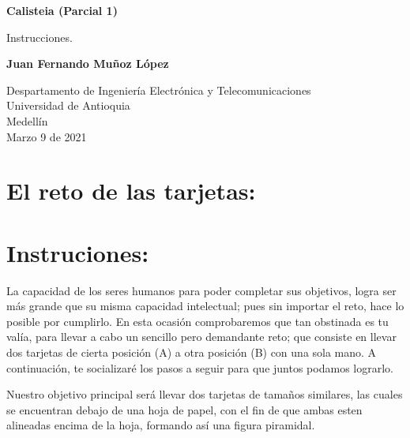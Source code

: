 \documentclass{article}
\begin{document}
\begin{titlepage}
    \begin{center}
        \vspace*{1cm}
            
        \Huge
        \textbf{Calisteia (Parcial 1)}
            
        \vspace{0.5cm}
        \LARGE
        Instrucciones.
            
        \vspace{1.5cm}
            
        \textbf{Juan Fernando Muñoz López}
            
        \vfill
            
        \vspace{0.8cm}
            
        \Large
        Despartamento de Ingeniería Electrónica y Telecomunicaciones\\
        Universidad de Antioquia\\
        Medellín\\
        Marzo 9 de 2021
            
    \end{center}
\end{titlepage}

\tableofcontents
\newpage
\section{El reto de las tarjetas: }\label{intro}


\section{Instruciones: } \label{contenido}
La capacidad de los seres humanos para poder completar sus objetivos, logra ser más grande que su misma capacidad intelectual; pues sin importar el reto, hace lo posible por cumplirlo. En esta ocasión comprobaremos que tan obstinada es tu valía, para llevar a cabo un sencillo pero demandante reto; que consiste en llevar dos tarjetas de cierta posición (A) a otra posición (B) con una sola mano. A continuación, te socializaré los pasos a seguir para que juntos podamos lograrlo.

\newline
Nuestro objetivo principal será llevar dos tarjetas de tamaños similares, las cuales se encuentran debajo de una hoja de papel, con el fin de que ambas esten alineadas encima de la hoja, formando así una figura piramidal.
\end{document}
